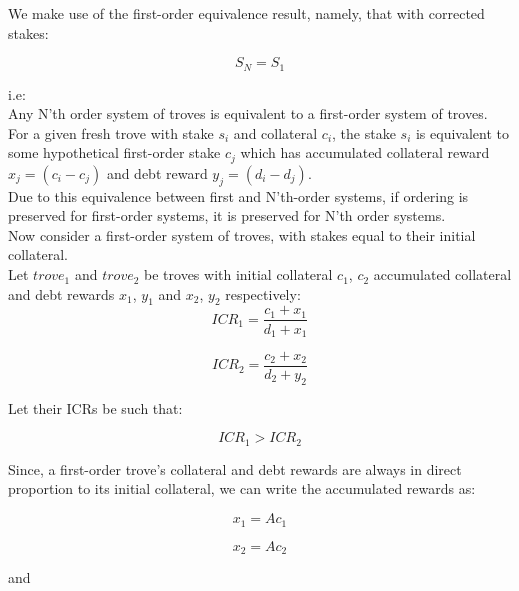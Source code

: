 \documentclass[reqno]{article}
\begin{document}
We make use of the first-order equivalence result, namely, that with corrected stakes:

\begin{equation} 
    S_N = S_1
\end{equation}

i.e:\\

Any N’th order system of troves is equivalent to a first-order system of troves. For a given fresh trove with stake $s_i$ and collateral $c_i$, the stake $s_i$ is equivalent to some hypothetical first-order stake $c_j$ which has accumulated collateral reward $x_j = (c_i - c_j)$ and debt reward $y_j = (d_i - d_j)$.\\

Due to this equivalence between first and N’th-order systems, if ordering is preserved for first-order systems, it is preserved for N’th order systems.\\

Now consider a first-order system of troves, with stakes equal to their initial collateral.\\

Let $trove_1$ and $trove_2$ be troves with initial collateral $c_1$, $c_2$ accumulated collateral and debt rewards $x_1$, $y_1$ and $x_2$, $y_2$ respectively:\\

\begin{equation} 
    ICR_1=\frac{c_1+x_1}{d_1+x_1}
\end{equation}

\begin{equation} 
    ICR_2=\frac{c_2+x_2}{d_2+y_2}
\end{equation}

Let their ICRs be such that:

\begin{equation} 
    ICR_1 > ICR_2
\end{equation}

\bigskip
Since, a first-order trove’s collateral and debt rewards are always in direct proportion to its initial collateral, we can write the accumulated rewards as:

\begin{equation} 
    x_1=Ac_1
\end{equation}

\begin{equation} 
    x_2=Ac_2
\end{equation}

and
\end{document}
